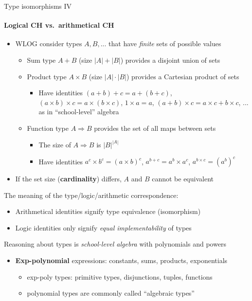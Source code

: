 \documentclass[english]{beamer}
\begin{document}
\begin{frame}{Type isomorphisms IV}


\framesubtitle{Logical CH vs.\ arithmetical CH}
\begin{itemize}
\item WLOG consider types $A,B,...$ that have \emph{finite} sets of possible
values
\begin{itemize}
\item Sum type $A+B$ (size $\left|A\right|+\left|B\right|$) provides a
disjoint union of sets
\item Product type $A\times B$ (size $\left|A\right|\cdot\left|B\right|$)
provides a Cartesian product of sets
\begin{itemize}
\item Have identities $\left(a+b\right)+c=a+\left(b+c\right)$, $\left(a\times b\right)\times c=a\times(b\times c)$,
$1\times a=a$, $\left(a+b\right)\times c=a\times c+b\times c$, ...
\textendash{} as in ``school-level'' algebra
\end{itemize}
\item Function type $A\Rightarrow B$ provides the set of all maps between
sets
\begin{itemize}
\item The size of $A\Rightarrow B$ is $\left|B\right|^{\left|A\right|}$
\item Have identities $a^{c}\times b^{c}=\left(a\times b\right)^{c}$, $a^{b+c}=a^{b}\times a^{c}$,
$a^{b\times c}=\left(a^{b}\right)^{c}$
\end{itemize}
\end{itemize}
\item If the set size (\textbf{cardinality}) differs, $A$ and $B$ cannot
be equivalent 
\end{itemize}
The meaning of the type/logic/arithmetic correspondence:
\begin{itemize}
\item Arithmetical identities signify type equivalence (isomorphism)
\item Logic identities only signify \emph{equal implementability} of types
\end{itemize}
Reasoning about types is \emph{school-level algebra} with polynomials
and powers
\begin{itemize}
\item \textbf{Exp-polynomial }expressions: constants, sums, products, exponentials
\begin{itemize}
\item exp-poly types: primitive types, disjunctions, tuples, functions
\item polynomial types are commonly called ``algebraic types''
\end{itemize}
\end{itemize}
\end{frame}
\end{document}
